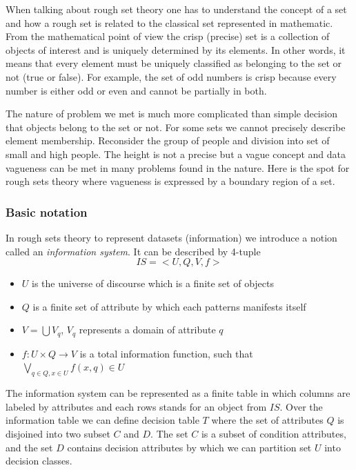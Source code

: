 When talking about rough set theory one has to understand the concept of a set 
and how a rough set is related to the classical set represented in mathematic.
From the mathematical point of view the crisp (precise) set is a collection of 
objects of interest and is uniquely determined by its elements. In other words,
it means that every element must be uniquely classified as belonging to the set 
or not (true or false). For example, the set of odd numbers is crisp because every
number is either odd or even and cannot be partially in both. 

The nature of problem we met is much more complicated than simple decision that
objects belong to the set or not. For some sets we cannot precisely describe element
membership. Reconsider the group of people and division into set of small and
high people. The height is not a precise but a vague concept and data vagueness can 
be met in many problems found in the nature. Here is the spot for rough sets
theory where vagueness is expressed by a boundary region of a set. 

\subsubsection{Basic notation}
\label{cha:Rough_set_basic_notation}
In rough sets theory to represent datasets (information) we introduce a notion 
called an \textit{information system}. It can be described by 4-tuple
$$IS = <U, Q, V, f >$$ 
\begin{itemize}
    \item $U$ is the universe of discourse  which is a finite set of objects
    \item $Q$ is a finite set of attribute by  which each patterns manifests itself
    \item $V = \bigcup V_q$, $V_q$ represents a domain of attribute $q$
    \item $f:U \times Q \rightarrow V$ is a total information function, such that
        $\bigvee_{q\in Q, x \in U} f(x,q) \in U$
\end{itemize} 
The information system can be represented as a finite table in which 
columns are labeled by attributes and each rows stands for an object from
$IS$. Over the information table we can define decision table
$T$ where the set of attributes $Q$ is disjoined into two
subset $C$ and $D$. The set $C$ is a subset of 
condition attributes, and the set $D$ contains decision attributes 
by which we can partition set $U$ into decision classes.

